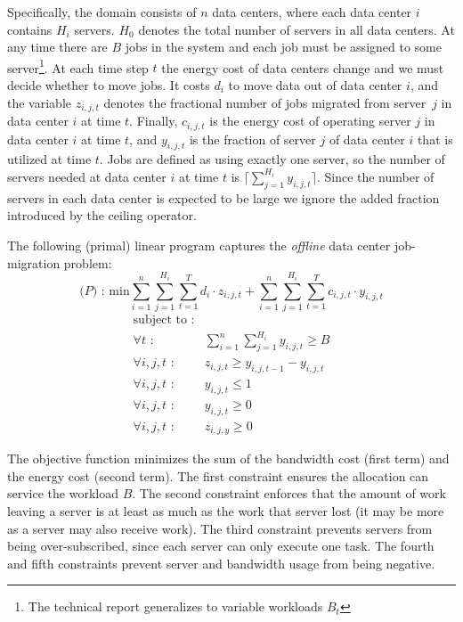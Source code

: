 Specifically, the domain consists of $n$ data centers, where each data center $i$ contains $H_i$ servers.
$H_0$ denotes the total number of servers in all data centers.
At any time there are $B$ jobs in the system and each job must be assigned to some server\footnote{The technical report generalizes to variable workloads $B_{t}$}.
At each time step $t$ the energy cost of data centers change and we must decide whether to move jobs. 
It costs $d_i$ to move data out of data center $i$, and the variable $z_{i,j,t}$ denotes the fractional number of jobs migrated from server~$j$ in data center $i$ at time $t$.
Finally, $c_{i,j,t}$ is the energy cost of operating server $j$ in data center $i$ at time $t$, and $y_{i,j,t}$ is the fraction of server $j$ of data center $i$ that is utilized at time $t$.
Jobs are defined as using exactly one server, so the number of servers needed at data center $i$ at time $t$ is $\lceil \sum^{H_i}_{j=1}y_{i,j,t} \rceil$.
Since the number of servers in each data center is expected to be large we ignore the added fraction introduced by the ceiling operator.

The following (primal) linear program captures the \emph{offline} data center job-migration problem:
\[
\textrm{($P$) : min}  \sum^n_{i=1}\sum^{H_i}_{j=1}\sum^{T}_{t=1}d_{i} \cdot z_{i,j,t} + \sum^{n}_{i=1}\sum^{H_{i}}_{j=1}\sum^{T}_{t=1} c_{i,j,t} \cdot y_{i,j,t}
\]
\[
	\begin{array}{rc}
	\textrm{subject to :} & \\
		\forall t \textrm{ :} & \sum^n_{i=1}\sum^{H_i}_{j=1}y_{i,j,t} \geq B \\
		\forall i,j,t \textrm{ :}	    & z_{i,j,t} \geq y_{i,j,t-1} - y_{i,j,t} \\
		\forall i,j,t \textrm{ :}	    & y_{i,j,t} \leq 1 \\
		\forall i,j,t \textrm{ :}	    & y_{i,j,t} \geq 0 \\
		\forall i,j,t \textrm{ :}	    & z_{i,j,y} \geq 0
	\end{array}
\]

The objective function minimizes the sum of the bandwidth cost (first term) and the energy cost (second term).
The first constraint ensures the allocation can service the workload $B$.
The second constraint enforces that the amount of work leaving a server is at least as much as the work that server lost (it may be more as a server may also receive work).
The third constraint prevents servers from being over-subscribed, since each server can only execute one task. 
The fourth and fifth constraints prevent server and bandwidth usage from being negative.


